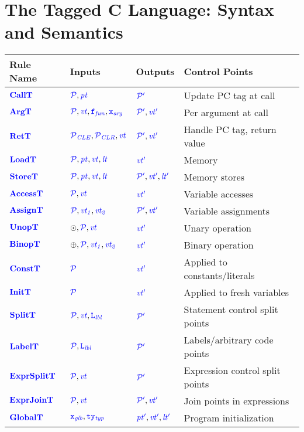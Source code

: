 \documentclass{llncs}
\begin{document}
\section{The Tagged C Language: Syntax and Semantics}
\label{sec:language}
\begin{table}[t]
\begin{center}
  \begin{tabular}{|l|l|l|l|}
    \hline
    Rule Name & Inputs & Outputs & Control Points \\
    \hline
    \(\calltname\)      & \(\calltargs\)         & \(\calltres\)      & Update PC tag at call \\
    \(\argtname\)       & \(\argtargs\)          & \(\argtres\)       & Per argument at call \\
    \(\rettname\)       & \(\rettargs\)          & \(\rettres\)       & Handle PC tag, return value \\
    \(\loadtname\)      & \(\loadtargs\)         & \(\loadtres\)      & Memory  \\
    \(\storetname\)     & \(\storetargs\)        & \(\storetres\)     & Memory stores \\
    \(\accesstname\)    & \(\accesstargs\)       & \(\accesstres\)    & Variable accesses \\
    \(\assigntname\)    & \(\assigntargs\)       & \(\assigntres\)    & Variable assignments \\
    \(\unoptname\)      & \(\unoptargs\)         & \(\unoptres\)      & Unary operation \\
    \(\binoptname\)     & \(\binoptargs\)        & \(\binoptres\)     & Binary operation \\
    \(\consttname\)     & \(\consttargs\)        & \(\consttres\)     & Applied to constants/literals \\
    \(\inittname\)      & \(\inittargs\)         & \(\inittres\)      & Applied to fresh variables \\
    \(\splittname\)     & \(\splittargs\)        & \(\splittres\)     & Statement control split points \\
    \(\labeltname\)     & \(\labeltargs\)        & \(\labeltres\)     & Labels/arbitrary code points \\
    \(\exprsplittname\) & \(\exprsplittargs\)    & \(\exprsplittres\) & Expression control split points \\
    \(\exprjointname\)  & \(\exprjointargs\)     & \(\exprjointres\)  & Join points in expressions \\
    \(\globaltname\)    & \(\globaltargs\)       & \(\globaltres\)    & Program initialization \\

\end{tabular}
\end{center}
\end{table}
\end{document}
